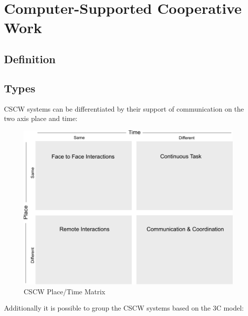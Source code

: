 
\section{Computer-Supported Cooperative Work}
\label{sec:cscw}

\subsection{Definition}
\label{sec:cscw_definition}


\subsection{Types}
\label{sec:cscw_types}

CSCW systems can be differentiated by their support of communication on the two axis place and time: \\

\begin{figure}[H]
 \centering
 \includegraphics[width=0.8\columnwidth]{images/cscw_time_place_matrix.pdf}
 \caption{CSCW Place/Time Matrix \citep{xx}}
\label{fig:images_cscw_time_place_matrix}
\end{figure}

Additionally it is possible to group the CSCW systems based on the 3C model: \\

